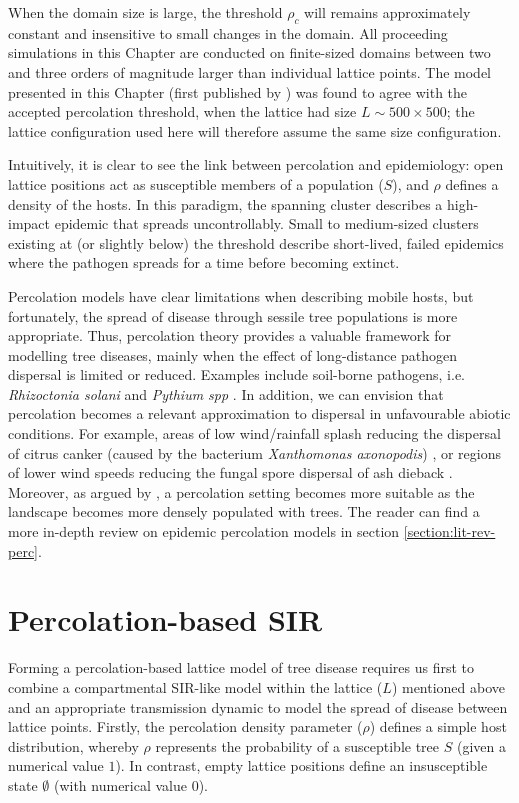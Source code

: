 When the domain size is large, the threshold $\rho_c$ will remains approximately constant and insensitive to small changes in the domain. 
All proceeding simulations in this Chapter are conducted on finite-sized domains between two and three orders of magnitude larger than individual lattice points.
The model presented in this Chapter (first published by \cite{OROZCOFUENTES201912}) was 
found to agree with the accepted percolation threshold, when the lattice had size $L \sim 500\times500$;
the lattice configuration used here will therefore assume the same size configuration. 

Intuitively, it is clear to see the link between percolation and epidemiology: 
open lattice positions act as susceptible members of a population ($S$), and $\rho$ defines a density of the hosts. 
In this paradigm, the spanning cluster describes a high-impact epidemic that spreads uncontrollably. 
Small to medium-sized clusters existing at (or slightly below) the threshold describe short-lived, 
failed epidemics where the pathogen spreads for a time before becoming extinct.

Percolation models have clear limitations when describing mobile hosts, but fortunately, the spread of disease through sessile tree populations is more appropriate. Thus, percolation theory provides a valuable framework for modelling tree diseases, mainly when the effect of long-distance pathogen dispersal is limited or reduced. Examples include soil-borne pathogens, i.e. \textit{Rhizoctonia solani} and \textit{Pythium spp} \cite{otten2004empirical, poggi2013percolation}. In addition, we can envision that percolation becomes a relevant approximation to dispersal in unfavourable abiotic conditions. For example, areas of low wind/rainfall splash reducing the dispersal of citrus canker (caused by the bacterium \textit{Xanthomonas axonopodis}) \cite{bock2010wind}, or regions of lower wind speeds reducing the fungal spore dispersal of ash dieback \cite{solheim2017spread}. Moreover, as argued by \cite{OROZCOFUENTES201912}, a percolation setting becomes more suitable as the landscape becomes more densely populated with trees.
The reader can find a more in-depth review on epidemic percolation models in section \ref{section:lit-rev-perc}. 

\section{Percolation-based SIR}

Forming a percolation-based lattice model of tree disease requires us first to combine a compartmental SIR-like model within the lattice ($L$) mentioned above and an appropriate transmission dynamic to model the spread of disease between lattice points. Firstly, the percolation density parameter ($\rho$) defines a simple host distribution, whereby $\rho$ represents the probability of a susceptible tree $S$ (given a numerical value $1$). In contrast, empty lattice positions define an insusceptible state $\emptyset$ (with numerical value $0$). 

